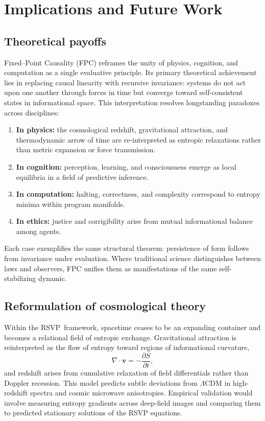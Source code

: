 \documentclass[12pt,a4paper]{article}
\newcommand{\RSVP}{RSVP}              %
\theoremstyle{plain}
\begin{document}
\section{Implications and Future Work}
\label{sec:implications}

\subsection{Theoretical payoffs}
Fixed--Point Causality (FPC) reframes the unity of physics, cognition, and computation as a single evaluative principle.  
Its primary theoretical achievement lies in replacing causal linearity with recursive invariance: systems do not act upon one another through forces in time but converge toward self-consistent states in informational space.  
This interpretation resolves longstanding paradoxes across disciplines:

\begin{enumerate}[label=(\alph*),nosep]
  \item \textbf{In physics:} the cosmological redshift, gravitational attraction, and thermodynamic arrow of time are re-interpreted as entropic relaxations rather than metric expansion or force transmission.
  \item \textbf{In cognition:} perception, learning, and consciousness emerge as local equilibria in a field of predictive inference.
  \item \textbf{In computation:} halting, correctness, and complexity correspond to entropy minima within program manifolds.
  \item \textbf{In ethics:} justice and corrigibility arise from mutual informational balance among agents.
\end{enumerate}

Each case exemplifies the same structural theorem: persistence of form follows from invariance under evaluation.
Where traditional science distinguishes between laws and observers, FPC unifies them as manifestations of the same self-stabilizing dynamic.

\subsection{Reformulation of cosmological theory}
Within the \RSVP\ framework, spacetime ceases to be an expanding container and becomes a relational field of entropic exchange.
Gravitational attraction is reinterpreted as the flow of entropy toward regions of informational curvature,
\[
\nabla \cdot \mathbf{v} = -\frac{\partial S}{\partial t},
\]
and redshift arises from cumulative relaxation of field differentials rather than Doppler recession.
This model predicts subtle deviations from $\Lambda$CDM in high-redshift spectra and cosmic microwave anisotropies.  
Empirical validation would involve measuring entropy gradients across deep-field images and comparing them to predicted stationary solutions of the RSVP equations.
\end{document}
